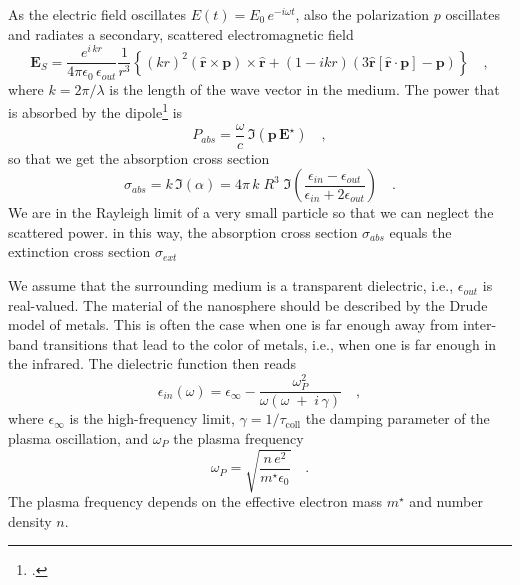 As the electric field oscillates $E(t) = E_0 \, e^{-i \omega t}$, also the polarization $p$ oscillates and radiates a secondary, scattered electromagnetic field 
\begin{equation}
  \mathbf{E}_S = \frac{ e^{i \, k  r} }{4\pi\epsilon_0 \, \epsilon_{out}}  \frac{1}{r^3}\left\{
      (k r )^2 \left( \hat{\mathbf{r}} \times \mathbf{p} \right) \times \hat{\mathbf{r}} +
      \left( 1 -  i k r \right)
        \left( 3\hat{\mathbf{r}} \left[\hat{\mathbf{r}} \cdot \mathbf{p}\right] - \mathbf{p} \right)
    \right\} \quad ,
     \label{eq:hybrid_Escat}
\end{equation}
where $k = 2 \pi / \lambda$ is the length of the wave vector in the medium. The power that is absorbed by the dipole\footcite[Chapter 8]{Novotny-Hecht2012} is
\begin{equation}
 P_{abs} = \frac{\omega}{c} \, \Im \left( \mathbf{p} \, \mathbf{E}^\star \right)  \quad ,
\end{equation}
so that we get the absorption cross section
\begin{equation}
 \sigma_{abs} = k \, \Im ( \alpha ) =  4 \pi \, k \; R^3 \; \Im \left( \frac{\epsilon_{in} - \epsilon_{out}}{\epsilon_{in} + 2 \epsilon_{out}} \right) \quad .
 \label{eq:hybrid_sigma_abs}
\end{equation}
We are in the Rayleigh  limit of a very small particle so that we can neglect the scattered power. in this way, the absorption cross section
$ \sigma_{abs} $ equals the extinction  cross section $ \sigma_{ext} $ 


We  assume that the surrounding  medium  is a transparent dielectric, i.e., 
$\epsilon_{out}$ is real-valued. The material of the nanosphere should be described by the Drude model of metals. This is often the case when one is far enough away from inter-band transitions that lead to the color of metals, i.e., when one is far enough in the infrared. The dielectric function then reads
\begin{equation}
 \epsilon_{in} (\omega) = \epsilon_{\infty} - \frac{\omega_P^2}{ \omega \left(\omega \;
+ \; i\, \gamma \right) } \quad , \label{qq:hybrid_drude}
\end{equation}
where $\epsilon_{\infty} $ is the  high-frequency limit,  $\gamma = 1 / \tau_\text{coll} $ the damping parameter of the plasma oscillation, and $\omega_P$ the plasma frequency 
\begin{equation}
\omega_P = \sqrt{\frac{n \, e^2}{m^\star \epsilon_0}} \quad.
\end{equation}
The plasma frequency depends on the effective electron mass $m^\star$ and number density $n$.

